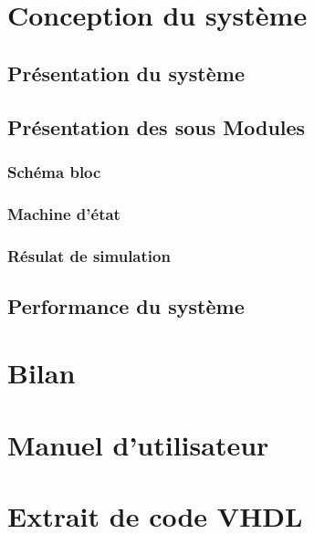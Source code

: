 \documentclass[a4paper,11pt]{article}
\begin{document}
\section{Conception du système}

\subsection{Présentation du système}
\subsection{Présentation des sous Modules}
\subsubsection{Schéma bloc}
\subsubsection{Machine d'état}
\subsubsection{Résulat de simulation}

\subsection{Performance du système}

\newpage
\section{Bilan}

\newpage
\appendix 
\section{Manuel d'utilisateur}

\newpage
\appendix 
\section{Extrait de code VHDL}

\end{document}
